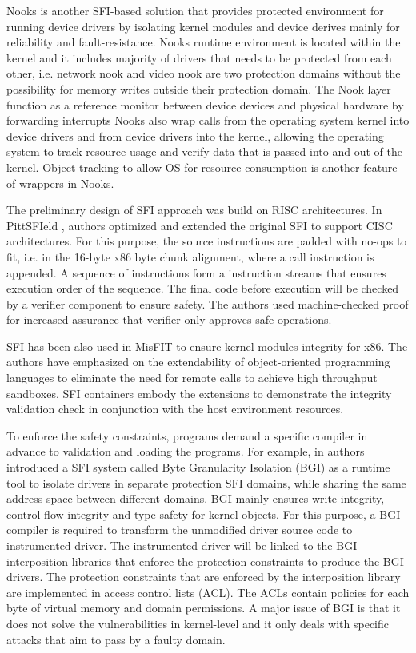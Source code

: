 Nooks \cite{Nooks:03} is another SFI-based solution that provides protected environment for running device drivers by isolating kernel modules and device derives mainly for reliability and fault-resistance. Nooks runtime environment is located within the kernel and it includes majority of drivers that needs to be protected from each other, i.e. network nook and video nook are two protection domains without the possibility for memory writes outside their protection domain. The Nook layer function as a reference monitor between device devices and physical hardware by forwarding interrupts  Nooks also wrap calls from the operating system kernel into device drivers and from device drivers into the kernel, allowing the operating system to track resource usage and verify data that is passed into and out of the kernel. Object tracking to allow OS for resource consumption is another feature of wrappers in Nooks. 


The preliminary design of SFI approach was build on RISC architectures. In PittSFIeld \cite{PittSFIeld}, authors optimized and extended the original SFI to support CISC architectures. For this purpose, the source instructions are padded with no-ops to fit, i.e. in the 16-byte x86 byte chunk alignment, where a call instruction is appended. A sequence of instructions form a instruction streams that ensures execution order of the sequence. The final code before execution will be checked by a verifier component to ensure safety. The authors used machine-checked proof for increased assurance that verifier only approves safe operations.

SFI has been also used in MisFIT \cite{MISFit} to ensure kernel modules integrity for x86. The authors have emphasized on the extendability of object-oriented programming languages to eliminate the need for remote calls to achieve high throughput sandboxes. SFI containers embody the extensions to demonstrate the integrity validation check in conjunction with the host environment resources.

To enforce the safety constraints, programs demand a specific compiler in advance to validation and loading the programs. For example, in \cite{Castro-BGI} authors introduced a SFI system called Byte Granularity Isolation (BGI) as a runtime tool to isolate drivers in separate protection SFI domains, while sharing the same address space between different domains. BGI mainly ensures write-integrity, control-flow integrity and type safety for kernel objects. For this purpose, a BGI compiler is required to transform the unmodified driver source code to instrumented driver. The instrumented driver will be linked to the BGI interposition libraries that enforce the protection constraints to produce the BGI drivers. The protection constraints that are enforced by the interposition library are implemented in access control lists (ACL). The ACLs contain policies for each byte of virtual memory and domain permissions. A major issue of BGI is that it does not solve the vulnerabilities in kernel-level and it only deals with specific attacks that aim to pass by a faulty domain.


